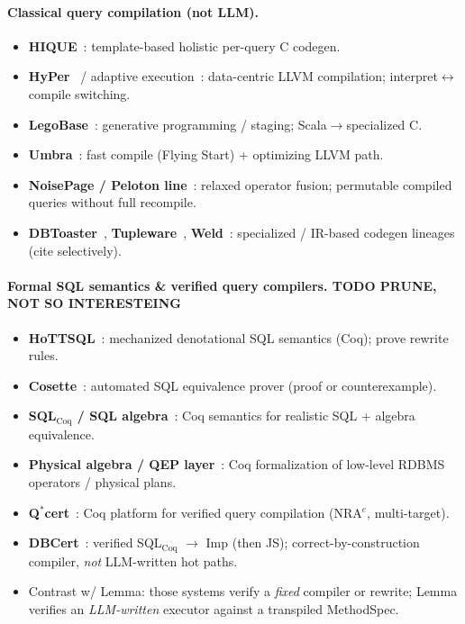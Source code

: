 \documentclass[sigconf, nonacm]{acmart}
\begin{document}
\paragraph{Classical query compilation (not LLM).}
\begin{itemize}
  \item \textbf{HIQUE}~\cite{Krikellas2010HIQUE}: template-based holistic per-query C codegen.
  \item \textbf{HyPer}~\cite{Neumann2011Hyper} / adaptive execution~\cite{Kohn2018Adaptive}: data-centric LLVM compilation; interpret$\leftrightarrow$compile switching.
  \item \textbf{LegoBase}~\cite{Klonatos2014LegoBase}: generative programming / staging; Scala$\to$specialized C.
  \item \textbf{Umbra}~\cite{Kersten2021UmbraFlyingStart}: fast compile (Flying Start) + optimizing LLVM path.
  \item \textbf{NoisePage / Peloton line}~\cite{Menon2017Relaxed,Menon2020Permutable}: relaxed operator fusion; permutable compiled queries without full recompile.
  \item \textbf{DBToaster}~\cite{Ahmad2012DBToaster}, \textbf{Tupleware}~\cite{Crotty2015Tupleware}, \textbf{Weld}~\cite{Palkar2018Weld}: specialized / IR-based codegen lineages (cite selectively).
\end{itemize}

\paragraph{Formal SQL semantics \& verified query compilers. TODO PRUNE, NOT SO INTERESTEING}
\begin{itemize}
  \item \textbf{HoTTSQL}~\cite{Chu2017HoTTSQL}: mechanized denotational SQL semantics (Coq); prove rewrite rules.
  \item \textbf{Cosette}~\cite{Chu2017Cosette}: automated SQL equivalence prover (proof or counterexample).
  \item \textbf{SQL$_{\mathrm{Coq}}$ / SQL algebra}~\cite{Benzaken2019SQLCoq}: Coq semantics for realistic SQL + algebra equivalence.
  \item \textbf{Physical algebra / QEP layer}~\cite{Benzaken2018Physical}: Coq formalization of low-level RDBMS operators / physical plans.
  \item \textbf{Q$^\ast$cert}~\cite{Auerbach2017Qcert}: Coq platform for verified query compilation (NRA$^e$, multi-target).
  \item \textbf{DBCert}~\cite{Benzaken2022DBCert}: verified SQL$_{\mathrm{Coq}}$ $\to$ Imp (then JS); correct-by-construction compiler, \emph{not} LLM-written hot paths.
  \item Contrast w/ Lemma: those systems verify a \emph{fixed} compiler or rewrite; Lemma verifies an \emph{LLM-written} executor against a transpiled MethodSpec.
\end{itemize}
\end{document}
